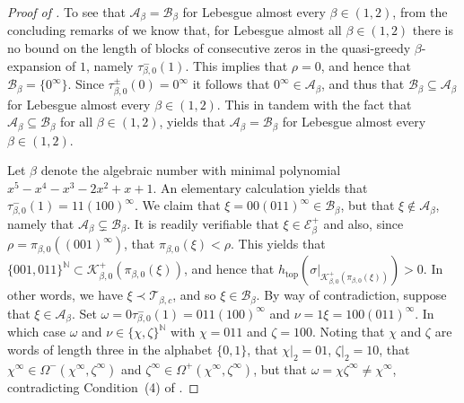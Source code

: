 \documentclass[a4paper,reqno,10pt]{amsart}
\begin{document}
\begin{proof}[Proof of \texorpdfstring{}{Theorem 1.1}]
To see that $\mathcal{A}_\beta = \mathcal{B}_\beta$ for Lebesgue almost every $\beta \in (1,2)$, from the concluding remarks of \cite{Schme} we know that, for Lebesgue almost all $\beta \in (1,2)$ there is no bound on the length of blocks of consecutive zeros in the quasi-greedy $\beta$-expansion of $1$, namely $\tau_{\beta,0}^-(1)$.  This implies that $\rho = 0$, and hence that $\mathcal{B}_\beta=\{ 0^\infty \}$. Since $\tau_{\beta,0}^{\pm}(0) = 0^\infty$ it follows that $0^\infty \in \mathcal{A}_\beta$, and thus that $\mathcal{B}_\beta \subseteq \mathcal{A}_\beta$ for Lebesgue almost every $\beta \in (1,2)$. This in tandem with the fact that $\mathcal{A}_\beta\subseteq \mathcal{B}_\beta$ for all $\beta \in (1,2)$, yields that $\mathcal{A}_\beta = \mathcal{B}_\beta$ for Lebesgue almost every $\beta \in (1,2)$.

Let $\beta$ denote the algebraic number with minimal polynomial $x^5-x^4-x^3-2x^2+x+1$. An elementary calculation yields that $\tau_{\beta,0}^{-}(1)=11(100)^{\infty}$. We claim that $\xi = 00(011)^\infty \in \mathcal{B}_\beta$, but that $\xi \not\in \mathcal{A}_\beta$, namely that $\mathcal{A}_\beta \subsetneq \mathcal{B}_\beta$.  It is readily verifiable that $\xi \in \mathcal{E}_\beta^+$ and also, since $\rho=\pi_{\beta,0}((001)^\infty)$, that $\pi_{\beta,0}(\xi) < \rho$. This yields that $\{001, 011 \}^\mathbb{N} \subset \mathcal{K}^{+}_{\beta,0}(\pi_{\beta,0}(\xi))$, and hence that $h_{\operatorname{top}}(\sigma\vert_{\mathcal{K}^{+}_{\beta,0}(\pi_{\beta,0}(\xi))}) > 0$. In other words, we have $\xi \prec \mathcal{T}_{\beta,c}$, and so $\xi \in \mathcal{B}_\beta $.  By way of contradiction, suppose that $\xi \in \mathcal{A}_\beta$.  Set $\omega=0\tau_{\beta,0}^{-}(1)=011(100)^\infty$ and $\nu = 1\xi = 100(011)^\infty$. In which case $\omega$ and $\nu \in \{ \chi, \zeta\}^\mathbb{N}$ with $\chi=011$ and $\zeta=100$. Noting that $\chi$ and $\zeta$ are words of length three in the alphabet $\{0,1\}$, that $\chi\vert_{2} = 01$, $\zeta\vert_{2} = 10$, that $\chi^\infty \in \Omega^{-}(\chi^\infty, \zeta^\infty)$ and $\zeta^\infty \in \Omega^{+}(\chi^\infty, \zeta^\infty)$, but that $\omega=\chi\zeta^\infty \neq \chi^\infty$, contradicting Condition~(4) of .


\end{proof}
\end{document}
